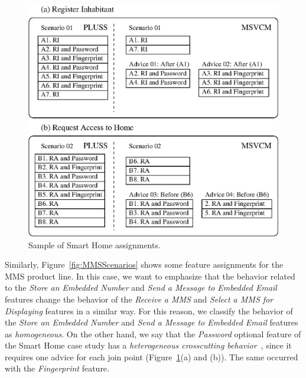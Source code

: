 \documentclass{sig-alternate}
\begin{document}
\begin{figure}[th]
 \begin{center}
  \includegraphics[scale=0.65]{img/comparisonScenarios.eps}
  \caption{Sample of Smart Home assignments.}
  \label{fig:smartHomeScenarios}
  \end{center}
\end{figure}

Similarly, Figure~\ref{fig:MMSScenarios} shows some feature assignments for the
MMS product line. In this case, we want to emphasize that the behavior related to
the \emph{Store an Embedded Number} and \emph{Send a Message to Embedded Email} 
features change the behavior of the \emph{Receive a MMS} and \emph{Select a
MMS for Displaying} features in a similar way. For this reason, we
classify the behavior of the \emph{Store an Embedded Number} and \emph{Send
a Message to Embedded Email} features as \emph{homogeneous}. On the other hand,
we say that the \emph{Password} optional feature of the Smart Home case study has a
\emph{heterogeneous crosscutting behavior}~\cite{Apel:2006aa}, since it requires one advice for each join point (Figure~\ref{fig:smartHomeScenarios}(a) and (b)). The same occurred with the \emph{Fingerprint} feature.
\end{document}
